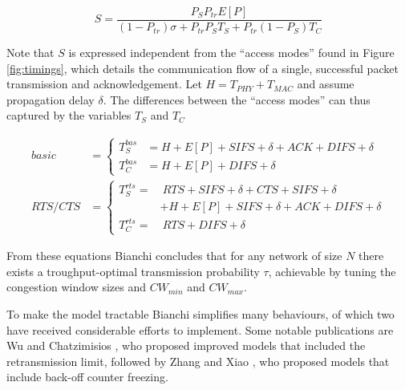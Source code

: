 \begin{equation} \label{eq:sbi}
	S = \frac{P_S P_{tr} E[P]}{(1-P_{tr})\sigma + P_{tr} P_S T_S + P_{tr} (1-P_S) T_C}
\end{equation}

Note that $S$ is expressed independent from the ``access modes'' found in
Figure \ref{fig:timings}, which details the communication flow of a single,
successful packet transmission and acknowledgement. Let $H = T_{\mathit{PHY}}
+ T_{\mathit{MAC}}$ and assume propagation delay $\delta$. The differences
between the ``access modes'' can thus captured by the variables $T_{S}$ and
$T_{C}$

\begin{align}  \label{eq:tbi}
	\mathit{basic} & = \left\{
	    \begin{aligned}
	        T^{bas}_{S} & = H + E[P] + \mathit{SIFS} + \delta + \mathit{ACK} + \mathit{DIFS} + \delta  \\
	        T^{bas}_{C} & = H + E[P] + \mathit{DIFS} + \delta
	    \end{aligned}
	\right. \\
	\mathit{RTS/CTS} & = \left\{
	    \begin{aligned}
	        T^{rts}_{S} = & ~ \mathit{RTS} + \mathit{SIFS} + \delta + \mathit{CTS} + \mathit{SIFS} + \delta \\ & + H + E[P] + \mathit{SIFS} + \delta + \mathit{ACK} + \mathit{DIFS} + \delta  \\
	        T^{rts}_{C} = & ~ \mathit{RTS} + \mathit{DIFS} + \delta
	    \end{aligned}
	\right.
\end{align}


From these equations Bianchi concludes that for any network of size $N$ there
exists a troughput-optimal transmission probability $\tau$, achievable by
tuning the congestion window sizes and $\mathit{CW_{min}}$ and $\mathit{CW_{max}}$.

To make the model tractable Bianchi simplifies many behaviours, of which two
have received considerable efforts to implement. Some notable publications 
are Wu \cite{1019305} and Chatzimisios \cite{1258379}, who proposed improved
models that included the retransmission limit, followed by Zhang
\cite{article} and Xiao \cite{1512111}, who proposed models that include
back-off counter freezing.

